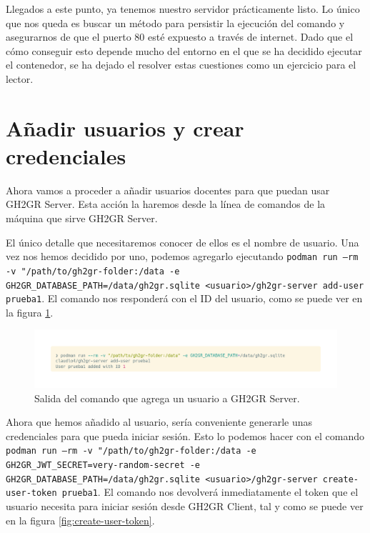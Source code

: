 Llegados a este punto, ya tenemos nuestro servidor prácticamente listo. Lo único que nos queda es buscar un método para persistir la ejecución del comando y asegurarnos de que el puerto 80 esté expuesto a través de internet. Dado que el cómo conseguir esto depende mucho del entorno en el que se ha decidido ejecutar el contenedor, se ha dejado el resolver estas cuestiones como un ejercicio para el lector.


\section{Añadir usuarios y crear credenciales} \label{title:add-user}
Ahora vamos a proceder a añadir usuarios docentes para que puedan usar GH2GR Server. Esta acción la haremos desde la línea de comandos de la máquina que sirve GH2GR Server.
\begin{sloppypar}
El único detalle que necesitaremos conocer de ellos es el nombre de usuario. Una vez nos hemos decidido por uno, podemos agregarlo ejecutando \texttt{podman run --rm -v "/path/to/gh2gr-folder:/data -e GH2GR\_DATABASE\_PATH=/data/gh2gr.sqlite <usuario>/gh2gr-server add-user prueba1}. El comando nos responderá con el ID del usuario, como se puede ver en la figura \ref{fig:add-user}.
\end{sloppypar}

\begin{figure}
    \centering
    \includegraphics[width=0.75\linewidth]{images/add-user.png}
    \caption{Salida del comando que agrega un usuario a GH2GR Server.}
    \label{fig:add-user}
\end{figure}

\begin{sloppypar}
Ahora que hemos añadido al usuario, sería conveniente generarle unas credenciales para que pueda iniciar sesión. Esto lo podemos hacer con el comando \texttt{podman run --rm -v "/path/to/gh2gr-folder:/data -e GH2GR\_JWT\_SECRET=very-random-secret -e GH2GR\_DATABASE\_PATH=/data/gh2gr.sqlite <usuario>/gh2gr-server create-user-token prueba1}. El comando nos devolverá inmediatamente el token que el usuario necesita para iniciar sesión desde GH2GR Client, tal y como se puede ver en la figura \ref{fig:create-user-token}.
\end{sloppypar}


